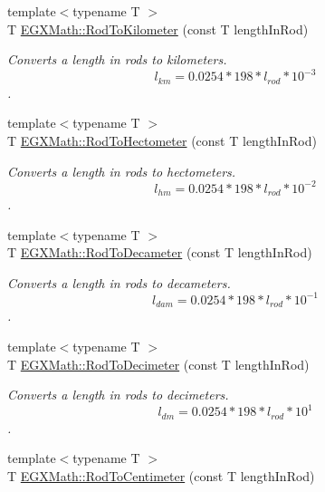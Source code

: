 \begin{DoxyCompactItemize}
{\footnotesize template$<$typename T $>$ }\\T \mbox{\hyperlink{group___e_g_x_math-_conversions-_length_conversions-_imperial-_rod-_s_i_ga074418cb0c673bef5eed361a610866a0}{E\+G\+X\+Math\+::\+Rod\+To\+Kilometer}} (const T length\+In\+Rod)
\begin{DoxyCompactList}\small\item\em Converts a length in rods to kilometers. \[ l_{km}=0.0254 * 198 * l_{rod} * 10^{-3} \]. \end{DoxyCompactList}\item 
{\footnotesize template$<$typename T $>$ }\\T \mbox{\hyperlink{group___e_g_x_math-_conversions-_length_conversions-_imperial-_rod-_s_i_ga9a5cefa380459848ac99b3f9784817ce}{E\+G\+X\+Math\+::\+Rod\+To\+Hectometer}} (const T length\+In\+Rod)
\begin{DoxyCompactList}\small\item\em Converts a length in rods to hectometers. \[ l_{hm}=0.0254 * 198 * l_{rod} * 10^{-2} \]. \end{DoxyCompactList}\item 
{\footnotesize template$<$typename T $>$ }\\T \mbox{\hyperlink{group___e_g_x_math-_conversions-_length_conversions-_imperial-_rod-_s_i_gaecb39eb3cc482aa4586ecbce219b6f34}{E\+G\+X\+Math\+::\+Rod\+To\+Decameter}} (const T length\+In\+Rod)
\begin{DoxyCompactList}\small\item\em Converts a length in rods to decameters. \[ l_{dam}=0.0254 * 198 * l_{rod} * 10^{-1} \]. \end{DoxyCompactList}\item 
{\footnotesize template$<$typename T $>$ }\\T \mbox{\hyperlink{group___e_g_x_math-_conversions-_length_conversions-_imperial-_rod-_s_i_gafaf133f63aeedbfc19093745bd005dca}{E\+G\+X\+Math\+::\+Rod\+To\+Decimeter}} (const T length\+In\+Rod)
\begin{DoxyCompactList}\small\item\em Converts a length in rods to decimeters. \[ l_{dm}=0.0254 * 198 * l_{rod} * 10^{1} \]. \end{DoxyCompactList}\item 
{\footnotesize template$<$typename T $>$ }\\T \mbox{\hyperlink{group___e_g_x_math-_conversions-_length_conversions-_imperial-_rod-_s_i_ga606f24d4f57fa79ea29cd16903899849}{E\+G\+X\+Math\+::\+Rod\+To\+Centimeter}} (const T length\+In\+Rod)

\end{DoxyCompactItemize}
